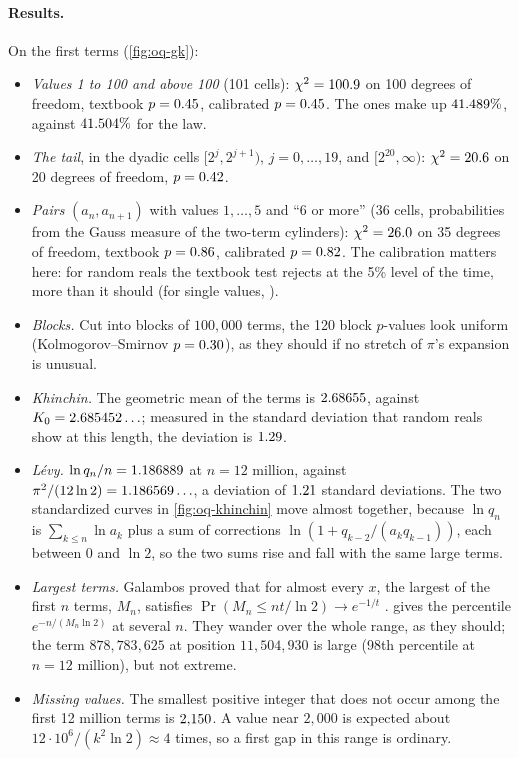 \paragraph{Results.} On the first \OqNT{} terms (\cref{fig:oq-gk}):
\begin{itemize}
\item \emph{Values 1 to 100 and above 100} (101 cells): $\chi^2 = 100.9$ on 100 degrees of freedom, textbook $p = 0.45$, calibrated $p = 0.45$. The ones make up $41.489\%$, against $41.504\%$ for the law.
\item \emph{The tail}, in the dyadic cells $[2^j, 2^{j+1})$, $j = 0, \dots, 19$, and $[2^{20}, \infty)$: $\chi^2 = 20.6$ on 20 degrees of freedom, $p = 0.42$.
\item \emph{Pairs} $(a_n, a_{n+1})$ with values $1, \dots, 5$ and ``6 or more'' (36 cells, probabilities from the Gauss measure of the two-term cylinders): $\chi^2 = 26.0$ on 35 degrees of freedom, textbook $p = 0.86$, calibrated $p = 0.82$. The calibration matters here: for random reals the textbook test rejects at the 5\% level \OqCalPair{} of the time, more than it should (for single values, \OqCalChi).
\item \emph{Blocks.} Cut into \OqBlocks{} blocks of $100{,}000$ terms, the 120 block $p$-values look uniform (Kolmogorov--Smirnov $p = 0.30$), as they should if no stretch of $\pi$'s expansion is unusual.
\item \emph{Khinchin.} The geometric mean of the terms is $2.68655$, against $K_0 = 2.685452\ldots$; measured in the standard deviation that random reals show at this length, the deviation is $1.29$.
\item \emph{Lévy.} $\ln q_n/n = 1.186889$ at $n = 12$ million, against $\pi^2/(12\ln 2) = 1.186569\ldots$, a deviation of $1.21$ standard deviations. The two standardized curves in \cref{fig:oq-khinchin} move almost together, because $\ln q_n$ is $\sum_{k \le n}\ln a_k$ plus a sum of corrections $\ln(1 + q_{k-2}/(a_k q_{k-1}))$, each between 0 and $\ln 2$, so the two sums rise and fall with the same large terms.
\item \emph{Largest terms.} Galambos proved that for almost every $x$, the largest of the first $n$ terms, $M_n$, satisfies $\Pr(M_n \le n t/\ln 2) \to e^{-1/t}$ \citep{Galambos1972}.  gives the percentile $e^{-n/(M_n\ln 2)}$ at several $n$. They wander over the whole range, as they should; the term $878{,}783{,}625$ at position $11{,}504{,}930$ is large (98th percentile at $n = 12$ million), but not extreme.
\item \emph{Missing values.} The smallest positive integer that does not occur among the first 12 million terms is $2{,}150$. A value near $2{,}000$ is expected about $12\cdot 10^6/(k^2\ln 2) \approx 4$ times, so a first gap in this range is ordinary.
\end{itemize}

